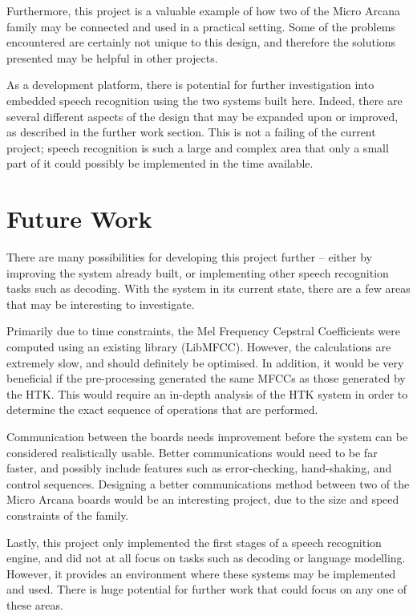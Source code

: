 	Furthermore, this project is a valuable example of how two of the Micro Arcana family may be connected and used in a practical setting.  Some of the problems encountered are certainly not unique to this design, and therefore the solutions presented may be helpful in other projects.

	As a development platform, there is potential for further investigation into embedded speech recognition using the two systems built here.  Indeed, there are several different aspects of the design that may be expanded upon or improved, as described in the further work section.  This is not a failing of the current project; speech recognition is such a large and complex area that only a small part of it could possibly be implemented in the time available.


\section{Future Work} %
\label{sec:future_work}
	There are many possibilities for developing this project further -- either by improving the system already built, or implementing other speech recognition tasks such as decoding.  With the system in its current state, there are a few areas that may be interesting to investigate.

	Primarily due to time constraints, the Mel Frequency Cepstral Coefficients were computed using an existing library (LibMFCC).  However, the calculations are extremely slow, and should definitely be optimised.  In addition, it would be very beneficial if the pre-processing generated the same MFCCs as those generated by the HTK.  This would require an in-depth analysis of the HTK system in order to determine the exact sequence of operations that are performed.

	Communication between the boards needs improvement before the system can be considered realistically usable.  Better communications would need to be far faster, and possibly include features such as error-checking, hand-shaking, and control sequences.  Designing a better communications method between two of the Micro Arcana boards would be an interesting project, due to the size and speed constraints of the family.

	Lastly, this project only implemented the first stages of a speech recognition engine, and did not at all focus on tasks such as decoding or language modelling.  However, it provides an environment where these systems may be implemented and used.  There is huge potential for further work that could focus on any one of these areas.


